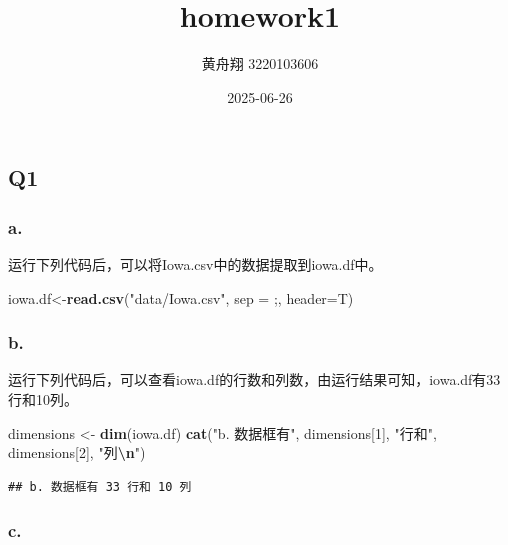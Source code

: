 \documentclass[
]{article}
\title{homework1}
\author{黄舟翔 3220103606}
\date{2025-06-26}
\newenvironment{Shaded}{\begin{snugshade}}{\end{snugshade}}
\newcommand{\AttributeTok}[1]{\textcolor[rgb]{0.13,0.29,0.53}{#1}}
\newcommand{\DecValTok}[1]{\textcolor[rgb]{0.00,0.00,0.81}{#1}}
\newcommand{\FunctionTok}[1]{\textcolor[rgb]{0.13,0.29,0.53}{\textbf{#1}}}
\newcommand{\NormalTok}[1]{#1}
\newcommand{\OtherTok}[1]{\textcolor[rgb]{0.56,0.35,0.01}{#1}}
\newcommand{\SpecialCharTok}[1]{\textcolor[rgb]{0.81,0.36,0.00}{\textbf{#1}}}
\newcommand{\StringTok}[1]{\textcolor[rgb]{0.31,0.60,0.02}{#1}}
\begin{document}
\maketitle

\subsection{Q1}\label{q1}

\subsubsection{a.}\label{a.}

运行下列代码后，可以将Iowa.csv中的数据提取到iowa.df中。

\begin{Shaded}
\begin{Highlighting}[]
\NormalTok{iowa.df}\OtherTok{\textless{}{-}}\FunctionTok{read.csv}\NormalTok{(}\StringTok{"data/Iowa.csv"}\NormalTok{, }\AttributeTok{sep =} \StringTok{\textquotesingle{};\textquotesingle{}}\NormalTok{, }\AttributeTok{header=}\NormalTok{T)}
\end{Highlighting}
\end{Shaded}

\subsubsection{b.}\label{b.}

运行下列代码后，可以查看iowa.df的行数和列数，由运行结果可知，iowa.df有33行和10列。

\begin{Shaded}
\begin{Highlighting}[]
\NormalTok{dimensions }\OtherTok{\textless{}{-}} \FunctionTok{dim}\NormalTok{(iowa.df)}
\FunctionTok{cat}\NormalTok{(}\StringTok{"b. 数据框有"}\NormalTok{, dimensions[}\DecValTok{1}\NormalTok{], }\StringTok{"行和"}\NormalTok{, dimensions[}\DecValTok{2}\NormalTok{], }\StringTok{"列}\SpecialCharTok{\textbackslash{}n}\StringTok{"}\NormalTok{)}
\end{Highlighting}
\end{Shaded}

\begin{verbatim}
## b. 数据框有 33 行和 10 列
\end{verbatim}

\subsubsection{c.}\label{c.}
\end{document}
